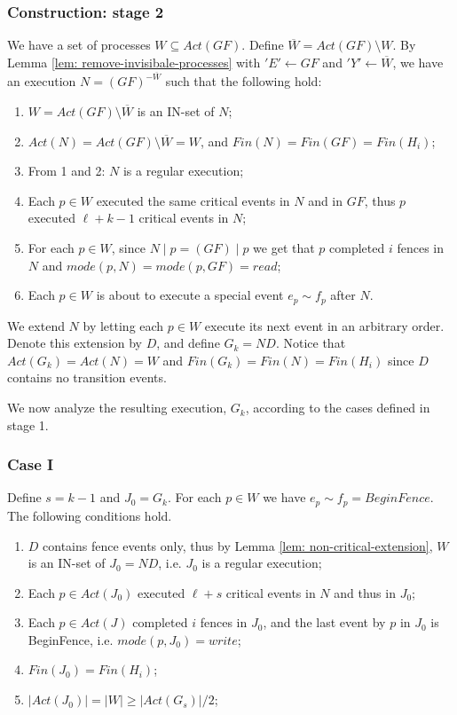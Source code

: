 \subsubsection{Construction: stage 2}
We have a set of processes $W \subseteq Act(G F)$. Define $\overline{W} = Act(G F) \setminus W$. By Lemma \ref{lem: remove-invisibale-processes} with $'E' \leftarrow G F$ and $'Y' \leftarrow \overline{W}$, we have an execution $N = (G F)^{-\overline{W}}$ such that the following hold:
\begin{enumerate}
	\item $W = Act(G F) \setminus \overline{W}$ is an IN-set of $N$;
	\item $Act(N) = Act(G F) \setminus \overline{W} = W$, and $Fin(N) = Fin(G F) = Fin(H_i)$;
	\item From 1 and 2: $N$ is a regular execution;
	\item Each $p \in W$ executed the same critical events in $N$ and in $G F$, thus $p$ executed $\ell+k-1$ critical events in $N$;
	\item For each $p \in W$, since $N \mid p = (G F) \mid p$ we get that $p$ completed $i$ fences in $N$ and $mode(p,N) = mode(p, G F) = read$;
	\item Each $p \in W$ is about to execute a special event $e_p \sim f_p$ after $N$.
\end{enumerate}

We extend $N$ by letting each $p \in W$ execute its next event in an arbitrary order. Denote this extension by $D$, and define $G_k = N D$. Notice that $Act(G_k) = Act(N) = W$ and $Fin(G_k) = Fin(N) = Fin(H_i)$ since $D$ contains no transition events.

We now analyze the resulting execution, $G_k$, according to the cases defined in stage 1.
\subsubsection*{\hspace{5mm} Case I}
Define $s=k-1$ and $J_0 = G_k$. For each $p \in W$ we have $e_p \sim f_p = BeginFence$. The following conditions hold.
\begin{enumerate}
	\item $D$ contains fence events only, thus by Lemma \ref{lem: non-critical-extension}, $W$ is an IN-set of $J_0 = N D$, i.e. $J_0$ is a regular execution;
	\item Each $p \in Act(J_0)$ executed $\ell+s$ critical events in $N$ and thus in $J_0$;
	\item Each $p \in Act(J)$ completed $i$ fences in $J_0$, and the last event by $p$ in $J_0$ is BeginFence, i.e. $mode(p,J_0) = write$;
	\item $Fin(J_0) = Fin(H_i)$;
	\item $|Act(J_0)| = |W| \geq |Act(G_s)|/2$;
\end{enumerate}

